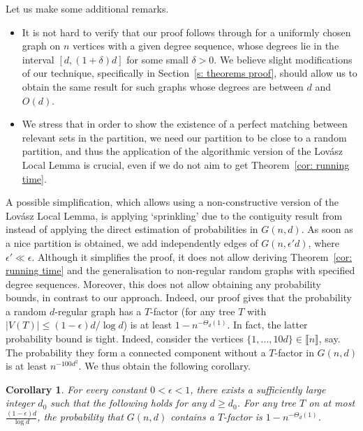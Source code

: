 \documentclass[notitlepage]{scrartcl}
\newcommand{\br}[1]{\llbracket{#1}\rrbracket}
\newtheorem{corollary}[thm]{Corollary}
\begin{document}
Let us make some additional remarks.
\begin{itemize}
    \item It is not hard to verify that our proof follows through for a uniformly chosen graph on $n$ vertices with a given degree sequence, whose degrees lie in the interval $[d,(1+\delta)d]$ for some small $\delta>0$. We believe slight modifications of our technique, specifically in Section~\ref{s: theorems proof}, should allow us to obtain the same result for such graphs whose degrees are between $d$ and $O(d)$.
     \item We stress that in order to show the existence of a perfect matching between relevant sets in the partition, we need our partition to be close to a random partition, and thus the application of the algorithmic version of the Lov\'asz Local Lemma is crucial, even if we do not aim to get Theorem~\ref{cor: running time}.
\end{itemize} 
A possible simplification, which allows using a non-constructive version of the Lov\'asz Local Lemma, is applying `sprinkling' due to the contiguity result from~\cite{Janson:contiguity} instead of applying the direct estimation of probabilities in $G(n,d)$. As soon as a nice partition is obtained, we add independently edges of $G(n,\epsilon' d)$, where $\epsilon'\ll\epsilon$. Although it simplifies the proof, it does not allow deriving Theorem~\ref{cor: running time} and the generalisation to non-regular random graphs with specified degree sequences. Moreover, this does not allow obtaining any probability bounds, in contrast to our approach. Indeed, our proof gives that the probability a random $d$-regular graph has a $T$-factor (for any tree $T$ with $|V(T)|\le (1-\epsilon)d/\log d$) is at least $1-n^{-\Theta_d(1)}$.
In fact, the latter probability bound is tight. Indeed, consider the vertices $\{1,...,10d\}\in \br{n}$, say. The probability they form a connected component without a $T$-factor in $G(n,d)$ is at least $n^{-100 d^2}$. We thus obtain the following corollary.
\begin{corollary}
For every constant $0< \epsilon<1$, there exists a sufficiently large integer $d_0$ such that the following holds for any $d\ge d_0$. For any tree $T$ on at most $\frac{(1-\epsilon)d}{\log d}$, the probability that $G(n,d)$ contains a $T$-factor is $1-n^{-\Theta_d(1)}$.
\end{corollary}
\end{document}
